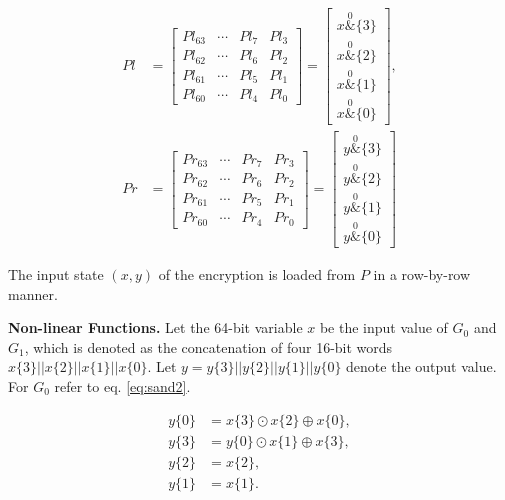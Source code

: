 \documentclass[conference]{IEEEtran}
\begin{document}
\begin{equation}
  \begin{aligned}
  Pl &=
  \begin{bmatrix}
  Pl_{63} & \cdots & Pl_7 & Pl_3 \\
  Pl_{62} & \cdots & Pl_6 & Pl_2 \\
  Pl_{61} & \cdots & Pl_5 & Pl_1 \\
  Pl_{60} & \cdots & Pl_4 & Pl_0
  \end{bmatrix}
  =
  \begin{bmatrix}
  x\overset{0} & \{3\} \\
  x\overset{0} & \{2\} \\
  x\overset{0} & \{1\} \\
  x\overset{0} & \{0\}
  \end{bmatrix}, \\
  Pr &=
  \begin{bmatrix}
  Pr_{63} & \cdots & Pr_7 & Pr_3 \\
  Pr_{62} & \cdots & Pr_6 & Pr_2 \\
  Pr_{61} & \cdots & Pr_5 & Pr_1 \\
  Pr_{60} & \cdots & Pr_4 & Pr_0
  \end{bmatrix}
  =
  \begin{bmatrix}
  y\overset{0} & \{3\} \\
  y\overset{0} & \{2\} \\
  y\overset{0} & \{1\} \\
  y\overset{0} & \{0\}
  \end{bmatrix}
  \end{aligned}
  \label{eq:sand1}
\end{equation}

The input state $(x,y)$ of the encryption is loaded from $P$ in a row-by-row manner.

\textbf{Non-linear Functions.} Let the 64-bit variable $x$ be the input value of $G_0$ and $G_1$, which is denoted as the concatenation of four 16-bit words $x\{3\}||x\{2\}||x\{1\}||x\{0\}$. Let $y = y\{3\}||y\{2\}||y\{1\}||y\{0\}$ denote the output value. For $G_0$ refer to eq. \ref{eq:sand2}.

\begin{equation}
  \begin{aligned}
  y\{0\} &= x\{3\} \odot x\{2\} \oplus x\{0\}, \\
  y\{3\} &= y\{0\} \odot x\{1\} \oplus x\{3\}, \\
  y\{2\} &= x\{2\}, \\
  y\{1\} &= x\{1\}.
  \end{aligned}
  \label{eq:sand2}
\end{equation}
\end{document}
